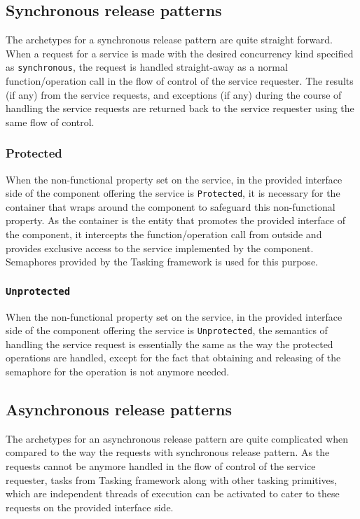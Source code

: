 \subsection{Synchronous release patterns}
The archetypes for a synchronous release pattern are quite straight forward. When a request for a service is made with the desired concurrency kind specified as \texttt{synchronous}, the request is handled straight-away as a normal function/operation call in the flow of control of the service requester. The results (if any) from the service requests, and exceptions (if any) during the course of handling the service requests are returned back to the service requester using the same flow of control.

\subsubsection{\textbf{Protected}}
When the non-functional property set on the service, in the provided interface side of the component offering the service is \texttt{Protected}, it is necessary for the container that wraps around the component to safeguard this non-functional property. As the container is the entity that promotes the provided interface of the component, it intercepts the function/operation call from outside and provides exclusive access to the service implemented by the component. Semaphores provided by the Tasking framework is used for this purpose.

\subsubsection{\texttt{Unprotected}}
When the non-functional property set on the service, in the provided interface side of the component offering the service is \texttt{Unprotected}, the semantics of handling the service request is essentially the same as the way the protected operations are handled, except for the fact that obtaining and releasing of the semaphore for the operation is not anymore needed.

\subsection{Asynchronous release patterns}
The archetypes for an asynchronous release pattern are quite complicated when compared to the way the requests with synchronous release pattern. As the requests cannot be anymore handled in the flow of control of the service requester, tasks from Tasking framework along with other tasking primitives, which are independent threads of execution can be activated to cater to these requests on the provided interface side. 

